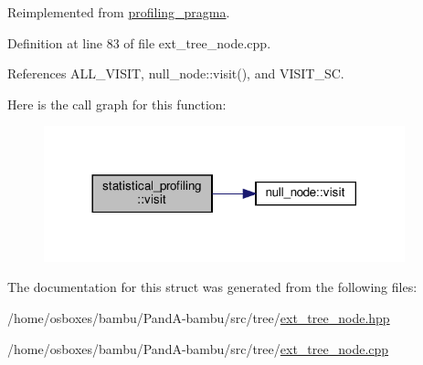 Reimplemented from \hyperlink{structprofiling__pragma_aa8bba94f73c0ad5b71140ac6fc79eb57}{profiling\+\_\+pragma}.



Definition at line 83 of file ext\+\_\+tree\+\_\+node.\+cpp.



References A\+L\+L\+\_\+\+V\+I\+S\+IT, null\+\_\+node\+::visit(), and V\+I\+S\+I\+T\+\_\+\+SC.

Here is the call graph for this function\+:
\nopagebreak
\begin{figure}[H]
\begin{center}
\leavevmode
\includegraphics[width=296pt]{d0/d5b/structstatistical__profiling_a5f57274294fc3dc9e32ddeec86c8d3d0_cgraph}
\end{center}
\end{figure}


The documentation for this struct was generated from the following files\+:\begin{DoxyCompactItemize}
\item 
/home/osboxes/bambu/\+Pand\+A-\/bambu/src/tree/\hyperlink{ext__tree__node_8hpp}{ext\+\_\+tree\+\_\+node.\+hpp}\item 
/home/osboxes/bambu/\+Pand\+A-\/bambu/src/tree/\hyperlink{ext__tree__node_8cpp}{ext\+\_\+tree\+\_\+node.\+cpp}\end{DoxyCompactItemize}
